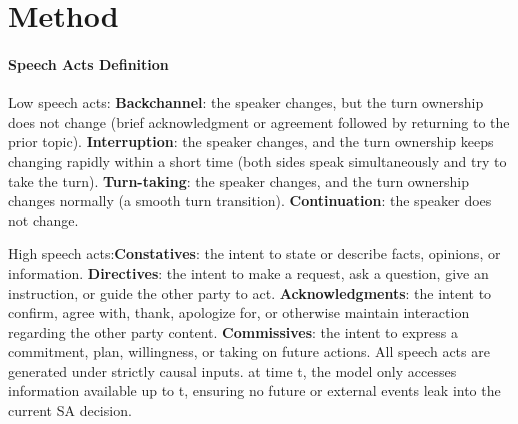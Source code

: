 \section{Method}
\paragraph{Speech Acts Definition}
Low speech acts:
\textbf{Backchannel}: the speaker changes, but the turn ownership does not change (brief acknowledgment or agreement followed by returning to the prior topic).
\textbf{Interruption}: the speaker changes, and the turn ownership keeps changing rapidly within a short time (both sides speak simultaneously and try to take the turn).
\textbf{Turn-taking}: the speaker changes, and the turn ownership changes normally (a smooth turn transition).
\textbf{Continuation}: the speaker does not change.

High speech acts:\textbf{Constatives}: the intent to state or describe facts, opinions, or information.
\textbf{Directives}: the intent to make a request, ask a question, give an instruction, or guide the other party to act.
\textbf{Acknowledgments}: the intent to confirm, agree with, thank, apologize for, or otherwise maintain interaction regarding the other party content.
\textbf{Commissives}: the intent to express a commitment, plan, willingness, or taking on future actions.
All speech acts are generated under strictly causal inputs. at time t, the model only accesses information available up to t, ensuring no future or external events leak into the current SA decision.

